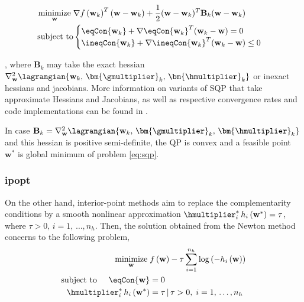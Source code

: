 \begin{equation}
\begin{aligned}
	\underset{\mathbf{w}}{\text{minimize}} \hspace{1mm} &\nabla f\left(\mathbf{w}_k\right)^T (\mathbf{w} - \mathbf{w}_k) + \frac{1}{2} (\mathbf{w} - \mathbf{w}_k)^T \mathbf{B}_k (\mathbf{w} - \mathbf{w}_k)\\
	\text{subject to} &
	\begin{cases}
		\eqCon{\mathbf{w}_k} + \nabla \eqCon{\mathbf{w}_k}^T (\mathbf{w}_k - \mathbf{w}) = 0\\
		\ineqCon{\mathbf{w}_k} + \nabla \ineqCon{\mathbf{w}_k}^T (\mathbf{w}_k - \mathbf{w}) \leq 0
	\end{cases}
\end{aligned}
\label{eq:sqp}
\end{equation}

\noindent , where $\mathbf{B}_k$ may take the exact hessian $\nabla_\mathbf{w}^2 \lagrangian{\mathbf{w}_k,\,\bm{\gmultiplier}_k,\,\bm{\hmultiplier}_k}$ or inexact hessians and jacobians. More information on variants of SQP that take approximate Hessians and Jacobians, as well as respective convergence rates and code implementations can be found in \cite{diehl2009efficient, diehlnumericalocp}.

\begin{remark}
In case $\mathbf{B}_k = \nabla_\mathbf{w}^2 \lagrangian{\mathbf{w}_k,\,\bm{\gmultiplier}_k,\,\bm{\hmultiplier}_k}$ and this hessian is positive semi-definite, the QP is convex and a feasible point $\mathbf{w}^*$ is  global minimum of problem \eqref{eq:sqp}.
\end{remark}

\subsubsection*{\acrlong{ipopt}}
\label{subsubsection:ipopt}

On the other hand, interior-point methods aim to replace the complementarity conditions by a smooth nonlinear approximation $\hmultiplier_i^* \, h_i\left( \mathbf{w}^*\right) = \tau$, where $\tau > 0,\, i = 1,\,\ldots,n_h$. Then, the solution obtained from the Newton method concerns to the following problem,
\begin{subequations}\label{eq:ipopt}
	\begin{align}
		\underset{\mathbf{w}}{\text{minimize}} \hspace{1mm} &f\left(\mathbf{w}\right) - \tau \sum_{i=1}^{n_h} \log\left(-h_i\left( \mathbf{w}\right) \right) \label{subeq:ipoptobj}\\
		\text{subject to} \hspace{5mm} \eqCon{\mathbf{w}} &= 0\label{subeq:ipoptg}\\
		\hmultiplier_i^* \, h_i\left( \mathbf{w}^*\right) &= \tau \, | \,\tau > 0,\;i = 1,\,\ldots,n_h \label{subeq:ipoptprimaldual}
	\end{align}
\end{subequations}


